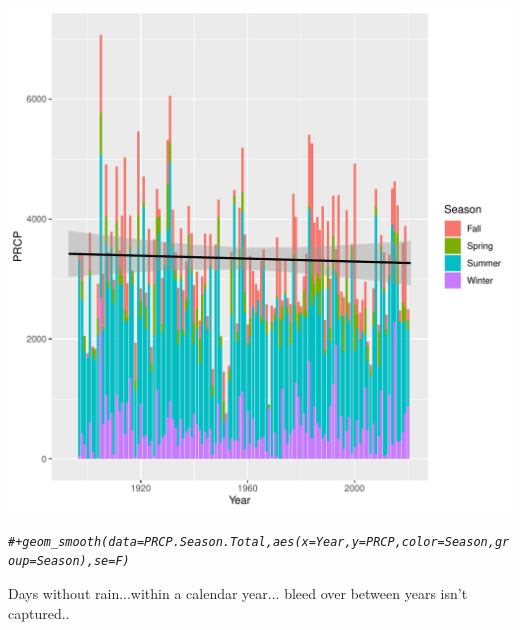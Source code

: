 \documentclass{article}\usepackage[]{graphicx}\usepackage[]{color}
\makeatletter
\def\maxwidth{ %
  \ifdim\Gin@nat@width>\linewidth
    \linewidth
  \else
    \Gin@nat@width
  \fi
}
\newcommand{\hlcom}[1]{\textcolor[rgb]{0.678,0.584,0.686}{\textit{#1}}}%
\newenvironment{kframe}{%
 \def\at@end@of@kframe{}%
 \ifinner\ifhmode%
  \def\at@end@of@kframe{\end{minipage}}%
  \begin{minipage}{\columnwidth}%
 \fi\fi%
 \def\FrameCommand##1{\hskip\@totalleftmargin \hskip-\fboxsep
 \colorbox{shadecolor}{##1}\hskip-\fboxsep
     \hskip-\linewidth \hskip-\@totalleftmargin \hskip\columnwidth}%
 \MakeFramed {\advance\hsize-\width
   \@totalleftmargin\z@ \linewidth\hsize
   \@setminipage}}%
 {\par\unskip\endMakeFramed%
 \at@end@of@kframe}
\newenvironment{knitrout}{}{} %
\makeatother
\begin{document}
\begin{knitrout}
\begin{kframe}
{\ttfamily\noindent\color{warningcolor}{\#\# Warning: Removed 5 rows containing missing values (geom\_bar).}}\end{kframe}
\includegraphics[width=\maxwidth]{figure/unnamed-chunk-11-1} 
\begin{kframe}\begin{alltt}
\hlcom{# + geom_smooth(data= PRCP.Season.Total, aes(x=Year, y = PRCP, color = Season, group=Season), se=F)}
\end{alltt}
\end{kframe}
\end{knitrout}

Days without rain...within a calendar year... bleed over between years isn't captured..
\end{document}
